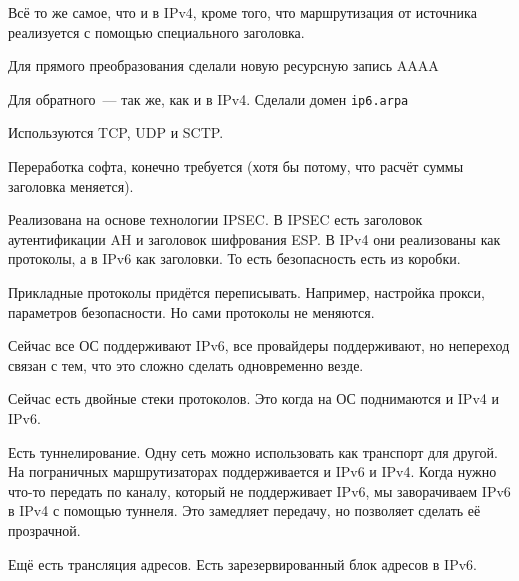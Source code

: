 Всё то же самое, что и в IPv4, кроме того, что маршрутизация от источника реализуется с помощью специального заголовка.


Для прямого преобразования сделали новую ресурсную запись AAAA

Для обратного~--- так же, как и в IPv4. Сделали домен {\tt ip6.arpa}


Используются TCP, UDP и SCTP.

Переработка софта, конечно требуется (хотя бы потому, что расчёт суммы заголовка меняется).


Реализована на основе технологии IPSEC. В IPSEC есть заголовок аутентификации AH и заголовок шифрования ESP. В IPv4 они реализованы как протоколы, а в IPv6 как заголовки. То есть безопасность есть из коробки.


Прикладные протоколы придётся переписывать. Например, настройка прокси, параметров безопасности. Но сами протоколы не меняются.

Сейчас все ОС поддерживают IPv6, все провайдеры поддерживают, но непереход связан с тем, что это сложно сделать одновременно везде.

Сейчас есть двойные стеки протоколов. Это когда на ОС поднимаются и IPv4 и IPv6.

Есть туннелирование. Одну сеть можно использовать как транспорт для другой. На пограничных маршрутизаторах поддерживается и IPv6 и IPv4. Когда нужно что-то передать по каналу, который не поддерживает IPv6, мы заворачиваем IPv6 в IPv4 с помощью туннеля. Это замедляет передачу, но позволяет сделать её прозрачной.

Ещё есть трансляция адресов. Есть зарезервированный блок адресов в IPv6. 
